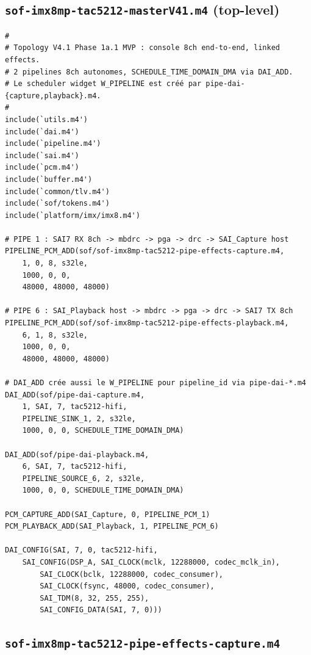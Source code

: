 \documentclass[11pt,a4paper]{article}
\begin{document}
\subsection{\texttt{sof-imx8mp-tac5212-masterV41.m4} (top-level)}

\begin{lstlisting}[language={}, basicstyle=\ttfamily\scriptsize]
#
# Topology V4.1 Phase 1a.1 MVP : console 8ch end-to-end, linked effects.
# 2 pipelines 8ch autonomes, SCHEDULE_TIME_DOMAIN_DMA via DAI_ADD.
# Le scheduler widget W_PIPELINE est créé par pipe-dai-{capture,playback}.m4.
#
include(`utils.m4')
include(`dai.m4')
include(`pipeline.m4')
include(`sai.m4')
include(`pcm.m4')
include(`buffer.m4')
include(`common/tlv.m4')
include(`sof/tokens.m4')
include(`platform/imx/imx8.m4')

# PIPE 1 : SAI7 RX 8ch -> mbdrc -> pga -> drc -> SAI_Capture host
PIPELINE_PCM_ADD(sof/sof-imx8mp-tac5212-pipe-effects-capture.m4,
    1, 0, 8, s32le,
    1000, 0, 0,
    48000, 48000, 48000)

# PIPE 6 : SAI_Playback host -> mbdrc -> pga -> drc -> SAI7 TX 8ch
PIPELINE_PCM_ADD(sof/sof-imx8mp-tac5212-pipe-effects-playback.m4,
    6, 1, 8, s32le,
    1000, 0, 0,
    48000, 48000, 48000)

# DAI_ADD crée aussi le W_PIPELINE pour pipeline_id via pipe-dai-*.m4
DAI_ADD(sof/pipe-dai-capture.m4,
    1, SAI, 7, tac5212-hifi,
    PIPELINE_SINK_1, 2, s32le,
    1000, 0, 0, SCHEDULE_TIME_DOMAIN_DMA)

DAI_ADD(sof/pipe-dai-playback.m4,
    6, SAI, 7, tac5212-hifi,
    PIPELINE_SOURCE_6, 2, s32le,
    1000, 0, 0, SCHEDULE_TIME_DOMAIN_DMA)

PCM_CAPTURE_ADD(SAI_Capture, 0, PIPELINE_PCM_1)
PCM_PLAYBACK_ADD(SAI_Playback, 1, PIPELINE_PCM_6)

DAI_CONFIG(SAI, 7, 0, tac5212-hifi,
    SAI_CONFIG(DSP_A, SAI_CLOCK(mclk, 12288000, codec_mclk_in),
        SAI_CLOCK(bclk, 12288000, codec_consumer),
        SAI_CLOCK(fsync, 48000, codec_consumer),
        SAI_TDM(8, 32, 255, 255),
        SAI_CONFIG_DATA(SAI, 7, 0)))
\end{lstlisting}

\subsection{\texttt{sof-imx8mp-tac5212-pipe-effects-capture.m4}}
\end{document}

